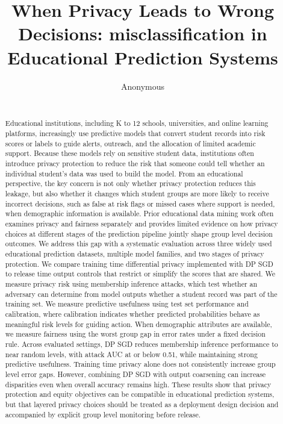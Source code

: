 \documentclass{edm_article}
\begin{document}
\title{When Privacy Leads to Wrong Decisions: misclassification in Educational Prediction Systems}

\author{
Anonymous\\
       \\
}

\maketitle

\begin{abstract}
Educational institutions, including K to 12 schools, universities, and online learning platforms, increasingly use predictive models that convert student records into risk scores or labels to guide alerts, outreach, and the allocation of limited academic support. Because these models rely on sensitive student data, institutions often introduce privacy protection to reduce the risk that someone could tell whether an individual student's data was used to build the model.  From an educational perspective, the key concern is not only whether privacy protection reduces this leakage, but also whether it changes which student groups are more likely to receive incorrect decisions, such as false at risk flags or missed cases where support is needed, when demographic information is available. Prior educational data mining work often examines privacy and fairness separately and provides limited evidence on how privacy choices at different stages of the prediction pipeline jointly shape group level decision outcomes. We address this gap with a systematic evaluation across three widely used educational prediction datasets, multiple model families, and two stages of privacy protection. We compare training time differential privacy implemented with DP SGD to release time output controls that restrict or simplify the scores that are shared. We measure privacy risk using membership inference attacks, which test whether an adversary can determine from model outputs whether a student record was part of the training set. We measure predictive usefulness using test set performance and calibration, where calibration indicates whether predicted probabilities behave as meaningful risk levels for guiding action. When demographic attributes are available, we measure fairness using the worst group gap in error rates under a fixed decision rule. Across evaluated settings, DP SGD reduces membership inference performance to near random levels, with attack AUC at or below 0.51, while maintaining strong predictive usefulness. Training time privacy alone does not consistently increase group level error gaps. However, combining DP SGD with output coarsening can increase disparities even when overall accuracy remains high. These results show that privacy protection and equity objectives can be compatible in educational prediction systems, but that layered privacy choices should be treated as a deployment design decision and accompanied by explicit group level monitoring before release.
\end{abstract}
\end{document}
